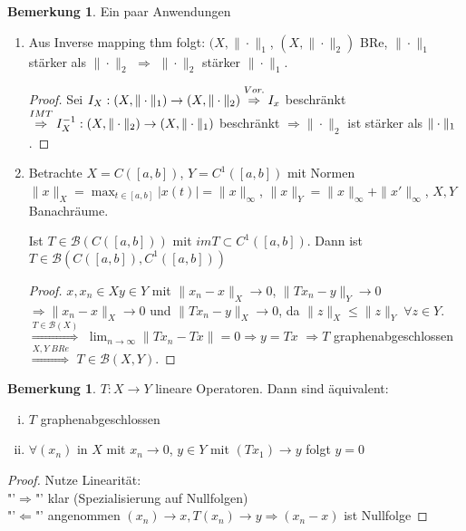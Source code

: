 \documentclass[ngerman]{report}
\theoremstyle{plain}%
\theoremstyle{definition}%
\theoremstyle{myStyle}
\newtheorem{bem}[thm]{Bemerkung}
\newcommand{\B}{\mathcal{B}} %
\newcommand{\BS}[1][X,Y]{\mathcal{B}(#1)} %
\newcommand{\norm}[1]{\|#1\|}
\newcommand{\df}[1][]{%
	\overset{#1}{\Rightarrow}
}
\newcommand{\limes}[1][\infty]{\lim_{n \to #1}}
\newcommand{\spcm}[1][-0.8]{\vspace{#1 em}}
\begin{document}
	\begin{bem}
		Ein paar Anwendungen
		\begin{enumerate}
			\item Aus Inverse mapping thm folgt: $(X,\norm{\cdot}_1$, $(X,\norm{\cdot}_2)$ BRe, $\norm{\cdot}_1$ stärker als $\norm{\cdot}_2$ $\df$
				 $\norm{\cdot}_2$ stärker $\norm{\cdot}_1$.
				 \begin{proof}
						\spcm
						Sei $I_X: (X,\norm{\cdot}_1)\to(X,\norm{\cdot}_2) \overset{Vor.}{\df}  I_x$ beschränkt $\overset{IMT}{\df} I_X^{-1}
						: (X,\norm{\cdot}_2) \to (X,\norm{\cdot}_1)$ beschränkt $\df \norm{\cdot}_2$ ist stärker als $\norm{\cdot}_1 \spcm$.
				 \end{proof}
			\item Betrachte $X = C([a,b])$, $Y = C^1([a,b])$ mit Normen $\norm{x}_X = \max_{t\in[a,b]} |x(t) | = \norm{x}_\infty$, $\norm{x}_Y = \norm{x}_\infty + \norm{x'}_\infty$, $X,Y$ Banachräume.\par
			Ist $T\in \B(C([a,b]))$ mit $imT \subset C^1([a,b])$. Dann ist $T\in \B(C([a,b]), C^1([a,b]))$
				\begin{proof}
					$x, x_n \in X y\in Y$ mit $\norm{x_n - x}_X \to 0$, $\norm{Tx_n - y}_Y \to 0$
					$\df \norm{x_n - x}_X \to 0$ und $\norm{Tx_n - y}_X \to 0$, da $\norm{z}_X \leq \norm{z}_Y \; \forall z\in Y$. $\df[T\in\B(X)]$ $\limes \norm{Tx_n - Tx} = 0 \df y = Tx$
					$\df T$ graphenabgeschlossen $\df[X,Y \; BRe]$ $T\in \BS$.
				\end{proof}
		\end{enumerate}

	\end{bem}

	\begin{bem}
		$T: X\to Y$ lineare Operatoren. Dann sind äquivalent:
			\begin{enumerate}[(i)]
				\item $T$ graphenabgeschlossen 
				\item $\forall (x_n)$ in $X$ mit $x_n \to 0$, $y\in Y$ mit $ (Tx_1) \to y$ folgt $y=0$ 
			\end{enumerate}

		\begin{proof}
			Nutze Linearität:\\
			"'$\df$"' klar (Spezialisierung auf Nullfolgen)\\
			"'$\Leftarrow$"' angenommen $(x_n) \to x, T(x_n) \to y \df (x_n-x)$ ist Nullfolge
		\end{proof}

	\end{bem}
\end{document}
